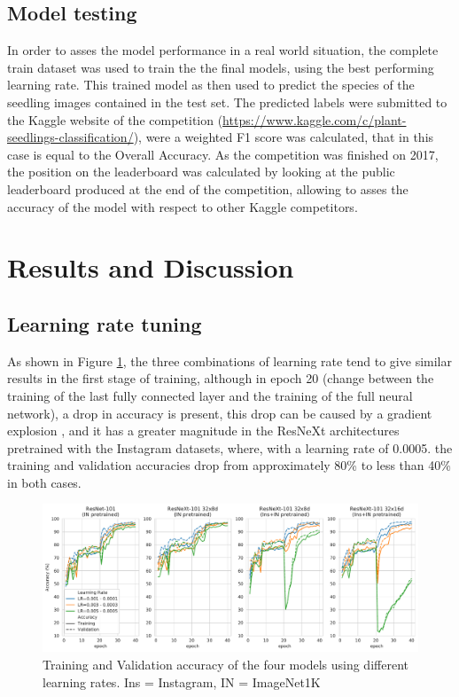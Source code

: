 \documentclass[11pt,onecolumn,titlepage,letterpaper]{article}
\begin{document}
\subsection{Model testing}

In order to asses the model performance in a real world situation, the complete train dataset was used to train the the final models, using the best performing learning rate. This trained model as then used to predict the species of the seedling images contained in the test set. The predicted labels were submitted to the Kaggle website of the competition (\url{https://www.kaggle.com/c/plant-seedlings-classification/}), were a weighted F1 score was calculated, that in this case is equal to the Overall Accuracy. As the competition was finished on 2017, the position on the leaderboard was calculated by looking at the public leaderboard produced at the end of the competition, allowing to asses the accuracy of the model with respect to other Kaggle competitors.

\section{Results and Discussion}

\subsection{Learning rate tuning}

As shown in Figure \ref{fig:lr}, the three combinations of learning rate tend to give similar results in the first stage of training, although in epoch 20 (change between the training of the last fully connected layer and the training of the full neural network), a drop in accuracy is present, this drop can be caused by a gradient explosion \cite{Aghdam2017}, and it has a greater magnitude in the ResNeXt architectures pretrained with the Instagram datasets, where, with a learning rate of 0.0005. the training and validation accuracies drop from approximately 80\% to less than 40\% in both cases.

\begin{figure}[h]
	\begin{center}
		\includegraphics[width=1.0\linewidth]{lr_4models.pdf}
	\end{center}
	\caption{Training and Validation accuracy of the four models using different learning rates. Ins = Instagram, IN = ImageNet1K}
	\label{fig:lr}
\end{figure}
\end{document}
